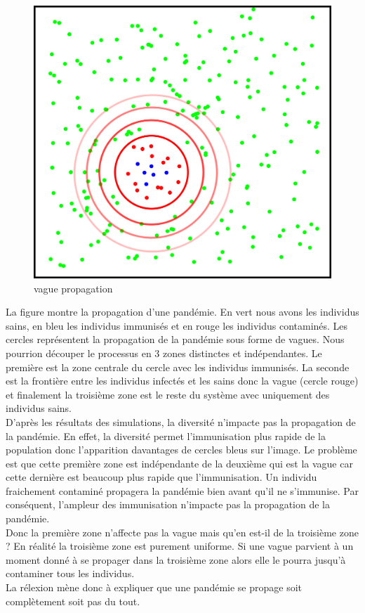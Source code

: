 \begin{figure}[h]
	\centering
	\captionsetup{justification=centering}
	\includegraphics[width=.5\textwidth]{Images/vague_propagation.png}
	\caption{vague propagation}
\end{figure}

La figure montre la propagation d'une pandémie. En vert nous avons les individus sains, en bleu les individus immunisés et en rouge les individus contaminés. Les cercles représentent la propagation de la pandémie sous forme de vagues. Nous pourrion découper le processus en 3 zones distinctes et indépendantes. Le première est la zone centrale du cercle avec les individus immunisés. La seconde est la frontière entre les individus infectés et les sains donc la vague (cercle rouge) et finalement la troisième zone est le reste du système avec uniquement des individus sains.\\

D'après les résultats des simulations, la diversité n'impacte pas la propagation de la pandémie. En effet, la diversité permet l'immunisation plus rapide de la population donc l'apparition davantages de cercles bleus sur l'image. Le problème est que cette première zone est indépendante de la deuxième qui est la vague car cette dernière est beaucoup plus rapide que l'immunisation. Un individu fraichement contaminé propagera la pandémie bien avant qu'il ne s'immunise. Par conséquent, l'ampleur des immunisation n'impacte pas la propagation de la pandémie.\\

Donc la première zone n'affecte pas la vague mais qu'en est-il de la troisième zone ? En réalité la troisième zone est purement uniforme. Si une vague parvient à un moment donné à se propager dans la troisième zone alors elle le pourra jusqu'à contaminer tous les individus.\\

La rélexion mène donc à expliquer que une pandémie se propage soit complètement soit pas du tout.\\

